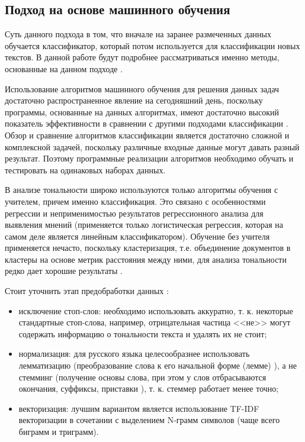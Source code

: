 \documentclass[a4paper,14pt, unknownkeysallowed]{extreport}
\begin{document}
	
	\subsection{Подход на основе машинного обучения}
	
	Суть данного подхода в том, что вначале на заранее размеченных данных обучается классификатор, который потом используется для классификации новых текстов. В данной работе будут подробнее рассматриваться именно методы, основанные на данном подходе \cite{Samigulin}.

	Использование алгоритмов машинного обучения для решения данных задач достаточно распространенное явление на сегодняшний день, поскольку программы, основанные на данных алгоритмах, имеют достаточно высокий показатель эффективности в сравнении с другими подходами классификации \cite{Noskov}. Обзор и сравнение алгоритмов классификации является достаточно сложной и комплексной задачей, поскольку различные входные данные могут давать разный результат. Поэтому программные реализации алгоритмов необходимо обучать и тестировать на одинаковых наборах данных.
	
	В анализе тональности широко используются только алгоритмы обучения с учителем, причем именно классификация. Это связано с особенностями регрессии и неприменимостью результатов регрессионного анализа для выявления мнений (применяется только логистическая регрессия, которая на самом деле является линейным классификатором). Обучение без учителя применяется нечасто, поскольку кластеризация, т.е. объединение документов в кластеры на основе метрик расстояния между ними, для анализа тональности редко дает хорошие результаты \cite{Semina2}.
	
	Стоит уточнить этап предобработки данных \cite{Volkova}:
	\begin{itemize}
		\item исключение стоп-слов: необходимо использовать аккуратно, т. к. некоторые стандартные стоп-слова, например, отрицательная частица <<не>> могут содержать информацию о тональности текста и удалять их не стоит;
		\item нормализация: для русского языка целесообразнее использовать лемматизацию (преобразование слова к его
		начальной форме (лемме) \cite{Dvoinikova}), а не стемминг (получение основы слова,
		при этом у слов отбрасываются окончания, суффиксы, приставки \cite{Dvoinikova}), т. к. стеммер работает менее точно;
		\item векторизация: лучшим вариантом является использование TF-IDF векторизации в сочетании с выделением N-грамм символов (чаще всего биграмм и триграмм).
	\end{itemize}
	
\end{document}
